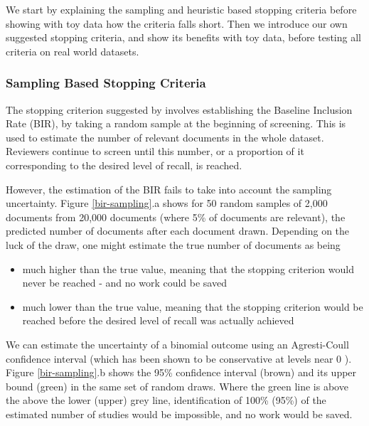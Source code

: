 \documentclass{bmcart}
\begin{document}
	We start by explaining the sampling and heuristic based stopping criteria before showing with toy data how the criteria falls short. Then we introduce our own suggested stopping criteria, and show its benefits with toy data, before testing all criteria on real world datasets.
	
	\subsubsection*{Sampling Based Stopping Criteria}
	
	The stopping criterion suggested by \cite{Shemilt2014} involves establishing the Baseline Inclusion Rate (BIR), by taking a random sample at the beginning of screening. This is used to estimate the number of relevant documents in the whole dataset. Reviewers continue to screen until this number, or a proportion of it corresponding to the desired level of recall, is reached.
	

	
	However, the estimation of the BIR fails to take into account the sampling uncertainty. 
	Figure \ref{bir-sampling}.a shows for 50 random samples of 2,000 documents from 20,000 documents (where 5\% of documents are relevant), the predicted number of documents after each document drawn. Depending on the luck of the draw, one might estimate the true number of documents as being
	\begin{itemize}
		\item much higher than the true value, meaning that the stopping criterion would never be reached - and no work could be saved
		\item much lower than the true value, meaning that the stopping criterion would be reached before the desired level of recall was actually achieved
	\end{itemize}
	
	We can estimate the uncertainty of a binomial outcome using an Agresti-Coull confidence interval (which has been shown to be conservative at levels near 0  \cite{Brown2001}). Figure \ref{bir-sampling}.b shows the 95\% confidence interval (brown) and its upper bound (green) in the same set of random draws. 
	Where the green line is above the above the lower (upper) grey line, identification of 100\% (95\%) of the estimated number of studies would be impossible, and no work would be saved.
	
\end{document}
